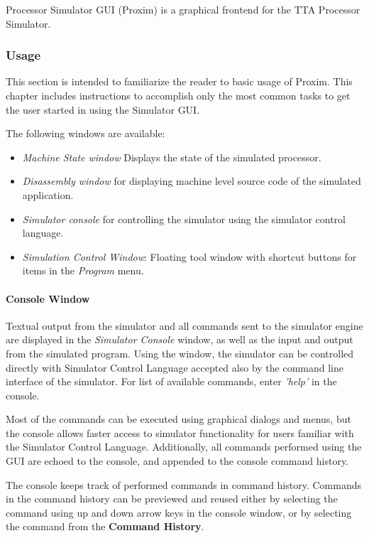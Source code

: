 \documentclass[a4paper,twoside]{tceusermanual}
\begin{document}
Processor Simulator GUI (Proxim) is a graphical frontend for 
the TTA Processor Simulator.

\subsubsection{Usage}

This section is intended to familiarize the reader to basic usage of 
Proxim. This chapter includes instructions to accomplish only the most
common tasks to get the user started in using the Simulator GUI.

The following windows are available:
\begin{itemize}
\item \emph{Machine State window} Displays the state of the simulated
processor. 
\item \emph{Disassembly window} for displaying machine level source
code of the simulated application. 
\item \emph{Simulator console} for controlling the simulator using
the simulator control language. 

\item \emph{Simulation Control Window}: Floating tool window with shortcut
buttons for items in the \emph{Program} menu.
\end{itemize}

\paragraph{Console Window}

Textual output from the simulator and all commands sent to the simulator
engine are displayed in the \emph{Simulator Console} window, as well as the
input and output from the simulated program. Using the window,
the simulator can be controlled directly with Simulator Control Language
accepted also by the command line interface of the simulator. For list of
available commands, enter \emph{'help'} in the console.

Most of the commands can be executed using graphical dialogs and
menus, but the console allows faster access to simulator functionality for
users familiar with the Simulator Control Language. Additionally, all commands
performed using the GUI are echoed to the console, and appended to the
console command history.

The console keeps track of performed commands in command history. Commands in
the command history can be previewed and reused either by selecting the
command using up and down arrow keys in the console window, or by selecting
the command from the \textbf{Command History}.
\end{document}

